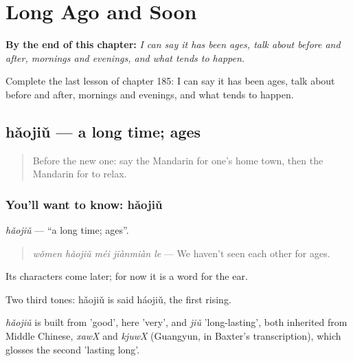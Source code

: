 
\chapter{Long Ago and Soon}
\label{ch:zh-long-ago-and-soon}

\begin{chapteropening}
\textbf{By the end of this chapter:} \emph{I can say it has been ages, talk about before and after, mornings and evenings, and what tends to happen.}

Complete the last lesson of chapter 185: I can say it has been ages, talk about before and after, mornings and evenings, and what tends to happen.
\end{chapteropening}

\section[hǎojiǔ]{hǎojiǔ — a long time; ages}

\label{lesson:ZH-C185-haojiu}



\begin{quote}
Before the new one: say the Mandarin for one's home town, then the Mandarin for to relax.
\end{quote}

\subsection*{You'll want to know: hǎojiǔ}
\emph{hǎojiǔ} — \textquotedblleft{}a long time; ages\textquotedblright{}.

\begin{quote}
\emph{wǒmen hǎojiǔ méi jiànmiàn le} — We haven't seen each other for ages.
\end{quote}

Its characters come later; for now it is a word for the ear.

Two third tones: hǎojiǔ is said háojiǔ, the first rising.

\begin{cousinweb}
\emph{hǎojiǔ} is built from  'good', here 'very', and \emph{jiǔ} 'long-lasting', both inherited from Middle Chinese, \emph{xawX} and \emph{kjuwX} (Guangyun, in Baxter's transcription), which glosses the second 'lasting long'.
\end{cousinweb}

